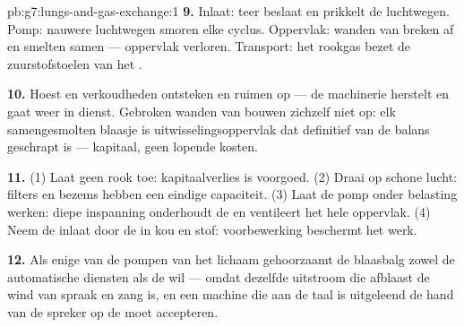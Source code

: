 \begin{solution}{pb:g7:lungs-and-gas-exchange:1}
\textbf{9.} Inlaat: teer beslaat en prikkelt de luchtwegen. Pomp: nauwere
luchtwegen smoren elke cyclus. Oppervlak: wanden van  breken
af en smelten samen --- oppervlak verloren. Transport: het rookgas bezet
de zuurstofstoelen van het .

\textbf{10.} Hoest en verkoudheden ontsteken en ruimen op --- de
machinerie herstelt en gaat weer in dienst. Gebroken wanden van
 bouwen zichzelf niet op: elk samengesmolten blaasje is
uitwisselingsoppervlak dat definitief van de balans geschrapt is ---
kapitaal, geen lopende kosten.

\textbf{11.} (1) Laat geen rook toe: kapitaalverlies is voorgoed. (2)
Draai op schone lucht: filters en bezems hebben een eindige capaciteit.
(3) Laat de pomp onder belasting werken: diepe inspanning onderhoudt de
 en ventileert het hele oppervlak. (4) Neem de inlaat door de 
in kou en stof: voorbewerking beschermt het werk.

\textbf{12.} Als enige van de pompen van het lichaam gehoorzaamt de
blaasbalg zowel de automatische diensten als de wil --- omdat dezelfde
uitstroom die  afblaast de wind van spraak en zang is, en
een machine die aan de taal is uitgeleend de hand van de spreker op de
 moet accepteren.
\end{solution}
